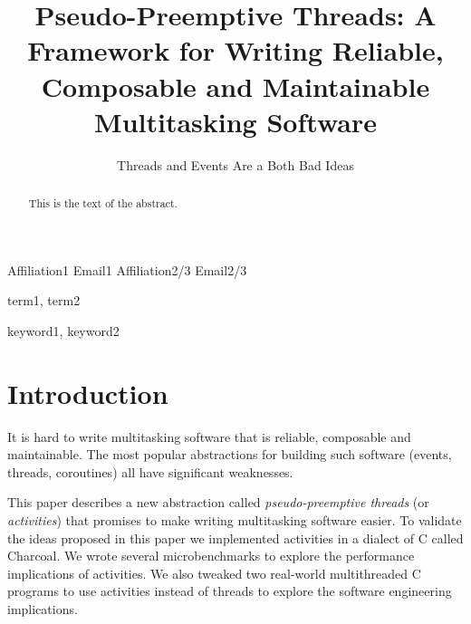 \documentclass[10pt,preprint]{sigplanconf}
\begin{document}
\newcommand{\charcoal}{Charcoal}

\setlength{\pdfpageheight}{\paperheight}
\setlength{\pdfpagewidth}{\paperwidth}



\title{Pseudo-Preemptive Threads: A Framework for Writing Reliable, Composable and Maintainable Multitasking Software}
\subtitle{Threads and Events Are a Both Bad Ideas}

           {Affiliation1}
           {Email1}
           {Affiliation2/3}
           {Email2/3}

\maketitle

\begin{abstract}
This is the text of the abstract.
\end{abstract}


\terms
term1, term2

\keywords
keyword1, keyword2

\section{Introduction}

It is hard to write multitasking software that is reliable, composable and maintainable.
The most popular abstractions for building such software (events, threads, coroutines) all have significant weaknesses.

This paper describes a new abstraction called \emph{pseudo-preemptive threads} (or \emph{activities}) that promises to make writing multitasking software easier.
To validate the ideas proposed in this paper we implemented activities in a dialect of C called \charcoal.
We wrote several microbenchmarks to explore the performance implications of activities.
We also tweaked two real-world multithreaded C programs to use activities instead of threads to explore the software engineering implications.
\end{document}
